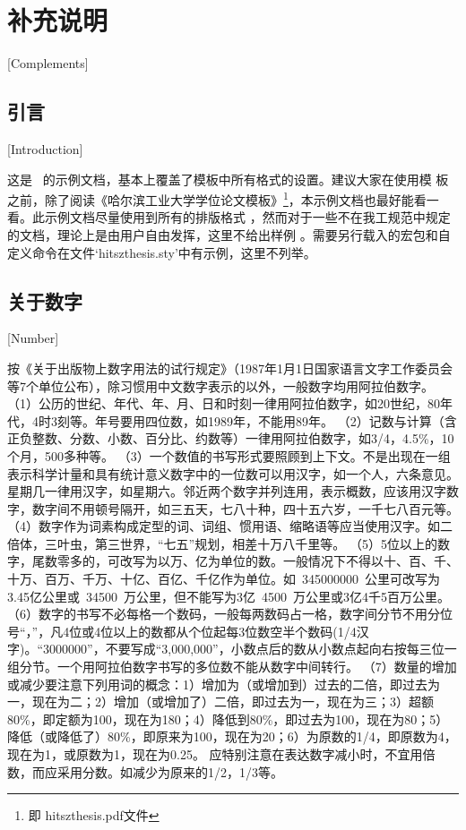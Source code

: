 
\chapter{补充说明}[Complements]

\section{引言}[Introduction]

这是 \hitszthesis\ 的示例文档，基本上覆盖了模板中所有格式的设置。建议大家在使用模
板之前，除了阅读《\hitszthesis\:哈尔滨工业大学学位论文模板》\footnote{即
	hitszthesis.pdf文件}，本示例文档也最好能看一看。此示例文档尽量使用到所有的排版格式
，然而对于一些不在我工规范中规定的文档，理论上是由用户自由发挥，这里不给出样例
。需要另行载入的宏包和自定义命令在文件`hitszthesis.sty'中有示例，这里不列举。

\section{关于数字}[Number]

按《关于出版物上数字用法的试行规定》（1987年1月1日国家语言文字工作委员会等7个单位公布），除习惯用中文数字表示的以外，一般数字均用阿拉伯数字。
（1）公历的世纪、年代、年、月、日和时刻一律用阿拉伯数字，如20世纪，80年代，4时3刻等。年号要用四位数，如1989年，不能用89年。
（2）记数与计算（含正负整数、分数、小数、百分比、约数等）一律用阿拉伯数字，如3/4，4.5\%，10个月，500多种等。
（3）一个数值的书写形式要照顾到上下文。不是出现在一组表示科学计量和具有统计意义数字中的一位数可以用汉字，如一个人，六条意见。星期几一律用汉字，如星期六。邻近两个数字并列连用，表示概数，应该用汉字数字，数字间不用顿号隔开，如三五天，七八十种，四十五六岁，一千七八百元等。
（4）数字作为词素构成定型的词、词组、惯用语、缩略语等应当使用汉字。如二倍体，三叶虫，第三世界，“七五”规划，相差十万八千里等。
（5）5位以上的数字，尾数零多的，可改写为以万、亿为单位的数。一般情况下不得以十、百、千、十万、百万、千万、十亿、百亿、千亿作为单位。如~\num{345000000}~公里可改写为3.45亿公里或~\num{34500}~万公里，但不能写为3亿~\num{4500}~万公里或3亿4千5百万公里。
（6）数字的书写不必每格一个数码，一般每两数码占一格，数字间分节不用分位号“，”，凡4位或4位以上的数都从个位起每3位数空半个数码(1/4汉字)。“\num{3000000}”，不要写成“3,000,000”，小数点后的数从小数点起向右按每三位一组分节。一个用阿拉伯数字书写的多位数不能从数字中间转行。
（7）数量的增加或减少要注意下列用词的概念：1）增加为（或增加到）过去的二倍，即过去为一，现在为二；2）增加（或增加了）二倍，即过去为一，现在为三；3）超额80\%，即定额为100，现在为180；4）降低到80\%，即过去为100，现在为80；5）降低（或降低了）80\%，即原来为100，现在为20；6）为原数的1/4，即原数为4，现在为1，或原数为1，现在为0.25。
应特别注意在表达数字减小时，不宜用倍数，而应采用分数。如减少为原来的1/2，1/3等。

